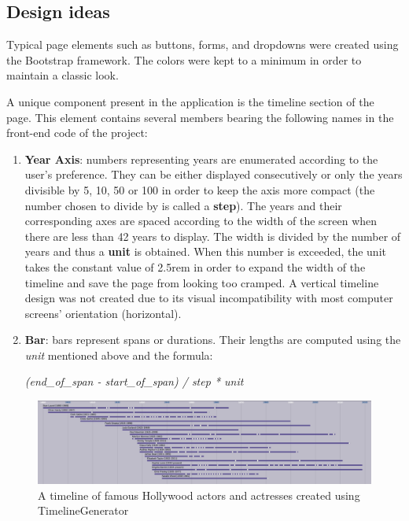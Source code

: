 \documentclass{report}
\begin{document}
\subsection {Design ideas}
Typical page elements such as buttons, forms, and dropdowns were created using the Bootstrap framework. The colors were kept to a minimum in order to maintain a classic look. \par
A unique component present in the application is the timeline section of the page. This element contains several members bearing the following names in the front-end code of the project:
\begin{enumerate}
  \item \textbf{Year Axis}: numbers representing years are enumerated according to the user's preference. They can be either displayed consecutively or only the years divisible by 5, 10, 50 or 100 in order to keep the axis more compact (the number chosen to divide by is called a \textbf{step}). The years and their corresponding axes are spaced according to the width of the screen when there are less than 42 years to display. The width is divided by the number of years and thus a \textbf{unit} is obtained. When this number is exceeded, the unit takes the constant value of 2.5rem in order to expand the width of the timeline and save the page from looking too cramped. A vertical timeline design was not created due to its visual incompatibility with most computer screens' orientation (horizontal). 
  \item \textbf{Bar}: bars represent spans or durations. Their lengths are computed using the \textit{unit} mentioned above and the formula:\\\centerline{\textit{(end\_of\_span - start\_of\_span) / step * unit}}
\end{enumerate}

\begin{figure}[h]
\vspace*{3cm}
\centerline{\includegraphics[scale=0.45]{tl}}
\caption{A timeline of famous Hollywood actors and actresses created using TimelineGenerator}
\end{figure}
\newpage
\end{document}
